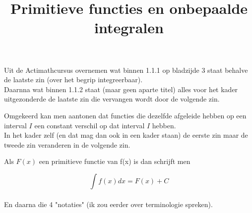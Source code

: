 \documentclass{article}
\title{Primitieve functies en onbepaalde integralen}
\date { }
\begin{document}
\maketitle \noindent

Uit de Actimathcursus overnemen wat binnen 1.1.1 op bladzijde 3 staat behalve de laatste zin (over het begrip integreerbaar).\\

Daarnna wat binnen 1.1.2 staat (maar geen aparte titel) alles voor het kader uitgezonderde de laatste zin die vervangen wordt door de volgende zin.

\noindent Omgekeerd kan men aantonen dat functies die dezelfde afgeleide hebben op een interval $I$ een constant verschil op dat interval $I$ hebben.\\

In het kader zelf (en dat mag dan ook in een kader staan) de eerste zin maar de tweede zin veranderen in de volgende zin.

\noindent Als $F(x)$ een primitieve functie van f(x) is dan schrijft men

\[
\int f(x)dx = F(x)+C
\]\\

En daarna die 4 "notaties" (ik zou eerder over terminologie spreken).
\end{document}
